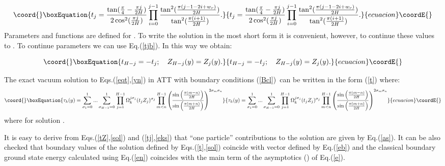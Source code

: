 \documentclass[a4paper,12pt,titlepage,final]{article}
\begin{document}
\begin{equation}\coord{}\boxEquation{
t_{j}=\frac{\tan (\frac{\pi }{4}-\frac{\pi j}{2H})}{2\cos ^{2}(\frac{\pi j}
{2H})}\prod_{i=0}^{j-1}\frac{\tan ^{2}(\frac{\pi (j-1-2i+w_{r})}{2H})}
{\tan^{2}(\frac{\pi (i+1)}{2H})}.  \label{tjb}
}{
t_{j}=\frac{\tan (\frac{\pi }{4}-\frac{\pi j}{2H})}{2\cos ^{2}(\frac{\pi j}
{2H})}\prod_{i=0}^{j-1}\frac{\tan ^{2}(\frac{\pi (j-1-2i+w_{r})}{2H})}
{\tan^{2}(\frac{\pi (i+1)}{2H})}.  }{ecuacion}\coordE{}\end{equation}
Parameters \coordHE{} and functions \coordHE{}
are defined for \coordHE{}. To write the solution in the most short form it
is convenient, however, to continue these values to \coordHE{}. To continue
parameters \coordHE{} we can use Eq.(\ref{tjb}). In this way we obtain:

\begin{equation}\coord{}\boxEquation{
t_{H-j}=-t_{j};\quad Z_{H-j}(y)=Z_{j}(y).  \label{tZ}
}{
t_{H-j}=-t_{j};\quad Z_{H-j}(y)=Z_{j}(y).  }{ecuacion}\coordE{}\end{equation}

The exact vacuum solution to Eqs.(\ref{eqt},\ref{yn}) in \coordHE{} ATT with
boundary conditions (\ref{Bcl})\ can be written in the form (\ref{t})
where:
\begin{equation}\coord{}\boxEquation{
\tau _{k}(y)=\sum_{\sigma _{1}=0}^{1}...\sum_{\sigma
_{H-1}=0}^{1}\prod_{j=1}^{H-1}\Omega _{k}^{j\sigma _{j}}(t_{j}Z_{j})^{\sigma
_{j}}\prod_{m<n}^{H-1}\left( \frac{\sin \left( \frac{\pi (m-n)}{2H}\right) }
{\sin \left( \frac{\pi (m+n)}{2H}\right) }\right) ^{2\sigma _{m}\sigma _{n}}
\label{sol}
}{
\tau _{k}(y)=\sum_{\sigma _{1}=0}^{1}...\sum_{\sigma
_{H-1}=0}^{1}\prod_{j=1}^{H-1}\Omega _{k}^{j\sigma _{j}}(t_{j}Z_{j})^{\sigma
_{j}}\prod_{m<n}^{H-1}\left( \frac{\sin \left( \frac{\pi (m-n)}{2H}\right) }
{\sin \left( \frac{\pi (m+n)}{2H}\right) }\right) ^{2\sigma _{m}\sigma _{n}}
}{ecuacion}\coordE{}\end{equation}
where for \coordHE{} solution \coordHE{}.

It is easy to derive from Eqs.(\ref{tZ},\ref{sol}) and (\ref{tj},\ref{eks})
that ``one particle'' contributions to the solution \coordHE{} are given by
Eq.(\ref{as}).
It can be also checked that boundary values of
the solution \coordHE{} defined by
Eqs.(\ref{t},\ref{sol}) coincide with vector \coordHE{} defined by
Eq.(\ref{eb}) and the classical boundary ground state energy calculated
using
Eq.(\ref{en}) coincides with the main term of the asymptotics (\coordHE{}) of
Eq.(\ref{e}).
\end{document}
